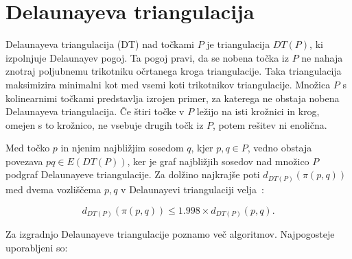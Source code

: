 \documentclass[a4paper, 12pt]{book}
\begin{document}
\section{Delaunayeva triangulacija}
Delaunayeva triangulacija (DT) nad točkami $P$ je triangulacija $DT(P)$, ki izpolnjuje Delaunayev pogoj. Ta pogoj pravi, da se nobena točka iz $P$ ne nahaja znotraj poljubnemu trikotniku očrtanega kroga triangulacije. Taka triangulacija
maksimizira minimalni kot med vsemi koti trikotnikov triangulacije. Množica $P$ s kolinearnimi točkami predstavlja izrojen primer, za katerega ne obstaja nobena Delaunayeva triangulacija. Če štiri točke v $P$ ležijo na isti krožnici in krog, omejen s to krožnico, ne vsebuje drugih točk iz $P$, potem rešitev ni enolična.

Med točko $p$ in njenim najbližjim sosedom $q$, kjer $p,q\in P$, vedno obstaja povezava $pq\in E(DT(P))$, ker je graf najbližjih sosedov nad množico $P$ podgraf Delaunayeve triangulacije. Za dolžino najkrajše poti $d_{DT(P)}(\pi (p,q))$ med dvema 
vozliščema $p,q$ v Delaunayevi triangulaciji velja~\cite{DT1998}:

\begin{equation*}
d_{DT(P)}(\pi (p,q)) \le 1.998\times d_{DT(P)}(p,q).
\end{equation*}

Za izgradnjo Delaunayeve triangulacije poznamo več algoritmov. Najpogosteje uporabljeni so: 
\end{document}

